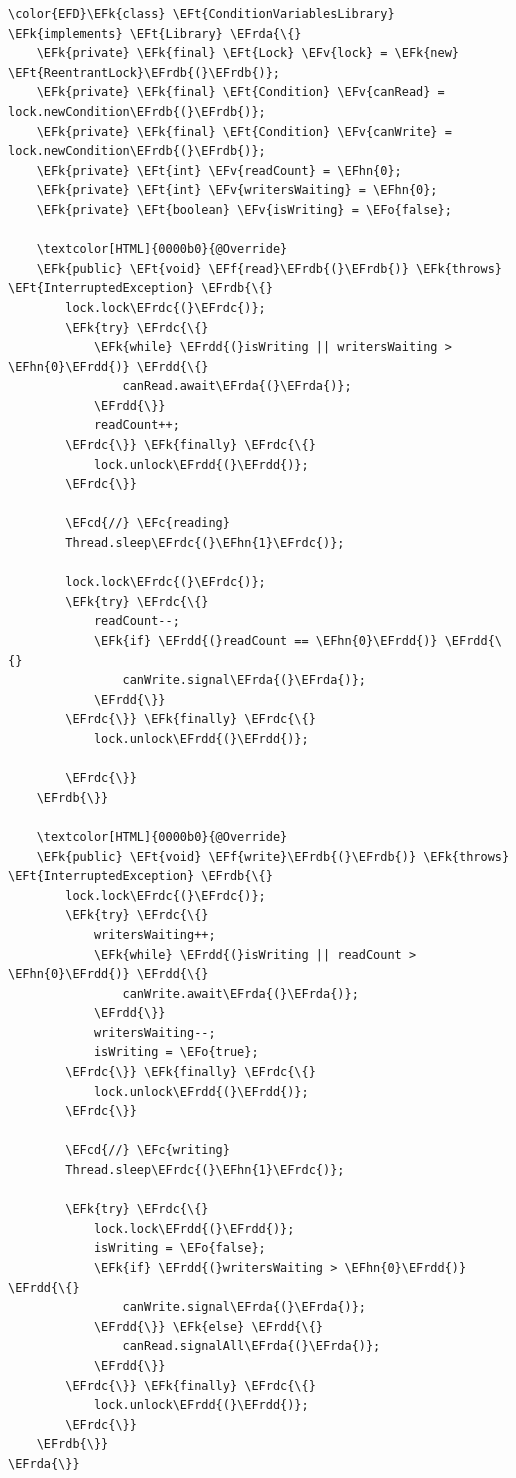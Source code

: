 \documentclass[11pt]{article}
\newcommand{\EFc}[1]{\textcolor{EFc}{\textit{#1}}} %
\newcommand{\EFcd}[1]{\textcolor{EFcd}{\textit{#1}}} %
\newcommand{\EFk}[1]{\textcolor{EFk}{#1}} %
\newcommand{\EFf}[1]{\textcolor{EFf}{#1}} %
\newcommand{\EFv}[1]{\textcolor{EFv}{#1}} %
\newcommand{\EFt}[1]{\textcolor{EFt}{#1}} %
\newcommand{\EFo}[1]{\textcolor{EFo}{#1}} %
\newcommand{\EFhn}[1]{\textcolor{EFhn}{#1}} %
\newcommand{\EFrda}[1]{#1} %
\newcommand{\EFrdb}[1]{\textcolor{EFrdb}{#1}} %
\newcommand{\EFrdc}[1]{\textcolor{EFrdc}{#1}} %
\newcommand{\EFrdd}[1]{\textcolor{EFrdd}{#1}} %
\begin{document}
\begin{Code}
\begin{Verbatim}
\color{EFD}\EFk{class} \EFt{ConditionVariablesLibrary} \EFk{implements} \EFt{Library} \EFrda{\{}
    \EFk{private} \EFk{final} \EFt{Lock} \EFv{lock} = \EFk{new} \EFt{ReentrantLock}\EFrdb{(}\EFrdb{)};
    \EFk{private} \EFk{final} \EFt{Condition} \EFv{canRead} = lock.newCondition\EFrdb{(}\EFrdb{)};
    \EFk{private} \EFk{final} \EFt{Condition} \EFv{canWrite} = lock.newCondition\EFrdb{(}\EFrdb{)};
    \EFk{private} \EFt{int} \EFv{readCount} = \EFhn{0};
    \EFk{private} \EFt{int} \EFv{writersWaiting} = \EFhn{0};
    \EFk{private} \EFt{boolean} \EFv{isWriting} = \EFo{false};

    \textcolor[HTML]{0000b0}{@Override}
    \EFk{public} \EFt{void} \EFf{read}\EFrdb{(}\EFrdb{)} \EFk{throws} \EFt{InterruptedException} \EFrdb{\{}
        lock.lock\EFrdc{(}\EFrdc{)};
        \EFk{try} \EFrdc{\{}
            \EFk{while} \EFrdd{(}isWriting || writersWaiting > \EFhn{0}\EFrdd{)} \EFrdd{\{}
                canRead.await\EFrda{(}\EFrda{)};
            \EFrdd{\}}
            readCount++;
        \EFrdc{\}} \EFk{finally} \EFrdc{\{}
            lock.unlock\EFrdd{(}\EFrdd{)};
        \EFrdc{\}}

        \EFcd{//} \EFc{reading}
        Thread.sleep\EFrdc{(}\EFhn{1}\EFrdc{)};

        lock.lock\EFrdc{(}\EFrdc{)};
        \EFk{try} \EFrdc{\{}
            readCount--;
            \EFk{if} \EFrdd{(}readCount == \EFhn{0}\EFrdd{)} \EFrdd{\{}
                canWrite.signal\EFrda{(}\EFrda{)};
            \EFrdd{\}}
        \EFrdc{\}} \EFk{finally} \EFrdc{\{}
            lock.unlock\EFrdd{(}\EFrdd{)};

        \EFrdc{\}}
    \EFrdb{\}}

    \textcolor[HTML]{0000b0}{@Override}
    \EFk{public} \EFt{void} \EFf{write}\EFrdb{(}\EFrdb{)} \EFk{throws} \EFt{InterruptedException} \EFrdb{\{}
        lock.lock\EFrdc{(}\EFrdc{)};
        \EFk{try} \EFrdc{\{}
            writersWaiting++;
            \EFk{while} \EFrdd{(}isWriting || readCount > \EFhn{0}\EFrdd{)} \EFrdd{\{}
                canWrite.await\EFrda{(}\EFrda{)};
            \EFrdd{\}}
            writersWaiting--;
            isWriting = \EFo{true};
        \EFrdc{\}} \EFk{finally} \EFrdc{\{}
            lock.unlock\EFrdd{(}\EFrdd{)};
        \EFrdc{\}}

        \EFcd{//} \EFc{writing}
        Thread.sleep\EFrdc{(}\EFhn{1}\EFrdc{)};

        \EFk{try} \EFrdc{\{}
            lock.lock\EFrdd{(}\EFrdd{)};
            isWriting = \EFo{false};
            \EFk{if} \EFrdd{(}writersWaiting > \EFhn{0}\EFrdd{)} \EFrdd{\{}
                canWrite.signal\EFrda{(}\EFrda{)};
            \EFrdd{\}} \EFk{else} \EFrdd{\{}
                canRead.signalAll\EFrda{(}\EFrda{)};
            \EFrdd{\}}
        \EFrdc{\}} \EFk{finally} \EFrdc{\{}
            lock.unlock\EFrdd{(}\EFrdd{)};
        \EFrdc{\}}
    \EFrdb{\}}
\EFrda{\}}
\end{Verbatim}
\end{Code}
\end{document}
